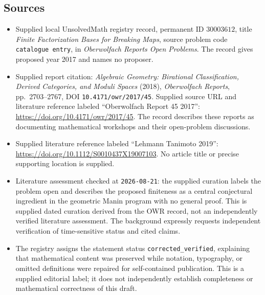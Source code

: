 \documentclass[11pt]{article}
\begin{document}
\subsection{Sources}
\begin{itemize}
\item Supplied local UnsolvedMath registry record, permanent ID \(30003612\), title \emph{Finite Factorization Bases for Breaking Maps}, source problem code \texttt{catalogue entry}, in \emph{Oberwolfach Reports Open Problems}. The record gives proposed year 2017 and names no proposer.
\item Supplied report citation: \emph{Algebraic Geometry: Birational Classification, Derived Categories, and Moduli Spaces} (2018), \emph{Oberwolfach Reports}, pp.~2703--2767, DOI \texttt{10.4171/owr/2017/45}. Supplied source URL and literature reference labeled ``Oberwolfach Report 45 2017'': \url{https://doi.org/10.4171/owr/2017/45}. The record describes these reports as documenting mathematical workshops and their open-problem discussions.
\item Supplied literature reference labeled ``Lehmann Tanimoto 2019'': \url{https://doi.org/10.1112/S0010437X19007103}. No article title or precise supporting location is supplied.
\item Literature assessment checked at \texttt{2026-08-21}: the supplied curation labels the problem open and describes the proposed finiteness as a central conjectural ingredient in the geometric Manin program with no general proof. This is supplied dated curation derived from the OWR record, not an independently verified literature assessment. The background expressly requests independent verification of time-sensitive status and cited claims.
\item The registry assigns the statement status \texttt{corrected\_verified}, explaining that mathematical content was preserved while notation, typography, or omitted definitions were repaired for self-contained publication. This is a supplied editorial label; it does not independently establish completeness or mathematical correctness of this draft.
\end{itemize}
\end{document}
